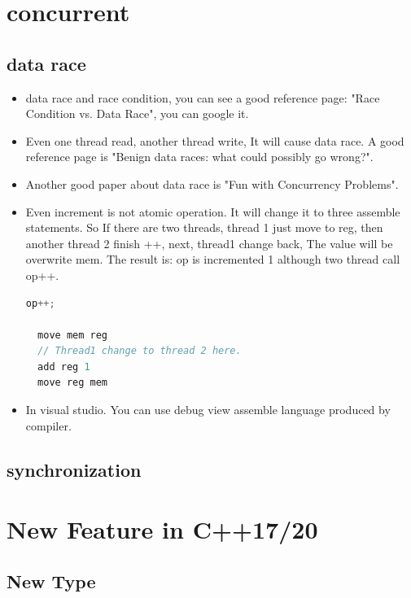 \documentclass[a4paper,12pt,twoside]{book}
\begin{document}
\chapter{concurrent}
\section{data race}
\begin{itemize}
\item data race and race condition, you can see a good reference page: "Race Condition vs. Data Race", you can google it.

\item Even one thread read, another thread write, It will cause data race. A good reference page is "Benign data races: what could possibly go wrong?". 

\item Another good paper about data race is "Fun with Concurrency Problems".

\item Even increment is not atomic operation. It will change it to three assemble statements. So If there are two threads, thread 1 just move to reg, then another thread 2 finish ++, next, thread1 change back, The value will be overwrite mem. The result is: op is incremented 1 although two thread call op++.
\begin{lstlisting}[frame=single, language=c++]
  op++;
  
  move mem reg
  // Thread1 change to thread 2 here. 
  add reg 1
  move reg mem
\end{lstlisting}

\item In visual studio. You can use debug view assemble language produced by compiler. 
\end{itemize}

\section{synchronization}

\chapter{New Feature in C++17/20}

\section{New Type}
\end{document}
